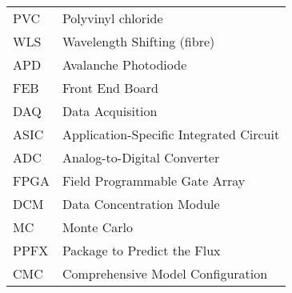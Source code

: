 \documentclass[12pt,a4paper]{report}
\let\openright=\clearpage
\begin{document}
\begin{table}[H]
\begin{tabular}{ll}
PVC        & Polyvinyl chloride                                \\
WLS        & Wavelength Shifting (fibre)                       \\
APD        & Avalanche Photodiode                              \\
FEB        & Front End Board                                   \\
DAQ        & Data Acquisition                                  \\
ASIC       & Application-Specific Integrated Circuit           \\
ADC        & Analog-to-Digital Converter                       \\
FPGA       & Field Programmable Gate Array                     \\
DCM        & Data Concentration Module                         \\
MC         & Monte Carlo                                       \\
PPFX       & Package to Predict the Flux                       \\
CMC        & Comprehensive Model Configuration                 \\
\end{tabular}
\end{table}



\appendix


\openright
\end{document}
